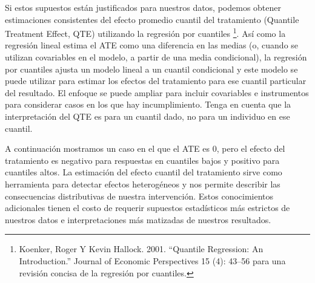 \documentclass[
]{article}
\begin{document}
Si estos supuestos están justificados para nuestros datos, podemos
obtener estimaciones consistentes del efecto promedio cuantil del
tratamiento (Quantile Treatment Effect, QTE) utilizando la regresión por
cuantiles \footnote{Koenker, Roger Y Kevin Hallock. 2001. ``Quantile
  Regression: An Introduction.'' Journal of Economic Perspectives 15
  (4): 43--56 para una revisión concisa de la regresión por cuantiles.}.
Así como la regresión lineal estima el ATE como una diferencia en las
medias (o, cuando se utilizan covariables en el modelo, a partir de una
media condicional), la regresión por cuantiles ajusta un modelo lineal a
un cuantil condicional y este modelo se puede utilizar para estimar los
efectos del tratamiento para ese cuantil particular del resultado. El
enfoque se puede ampliar para incluir covariables e instrumentos para
considerar casos en los que hay incumplimiento. Tenga en cuenta que la
interpretación del QTE es para un cuantil dado, no para un individuo en
ese cuantil.

A continuación mostramos un caso en el que el ATE es 0, pero el efecto
del tratamiento es negativo para respuestas en cuantiles bajos y
positivo para cuantiles altos. La estimación del efecto cuantil del
tratamiento sirve como herramienta para detectar efectos heterogéneos y
nos permite describir las consecuencias distributivas de nuestra
intervención. Estos conocimientos adicionales tienen el costo de
requerir supuestos estadísticos más estrictos de nuestros datos e
interpretaciones más matizadas de nuestros resultados.
\end{document}

